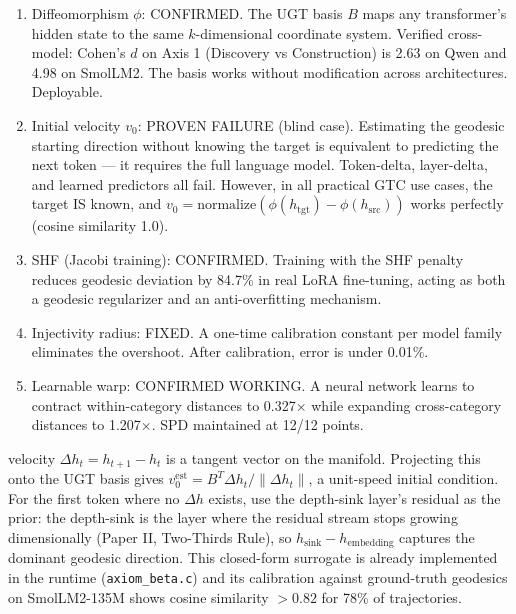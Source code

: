 \documentclass[11pt]{article}
\begin{document}
\begin{enumerate}
  \item Diffeomorphism $\phi$: CONFIRMED. The UGT basis $B$ maps any
        transformer's hidden state to the same $k$-dimensional coordinate
        system. Verified cross-model: Cohen's $d$ on Axis 1 (Discovery vs
        Construction) is 2.63 on Qwen and 4.98 on SmolLM2. The basis works
        without modification across architectures. Deployable.

  \item Initial velocity $v_0$: PROVEN FAILURE (blind case).
        Estimating the geodesic starting direction without knowing the target
        is equivalent to predicting the next token — it requires the full
        language model. Token-delta, layer-delta, and learned predictors all
        fail. However, in all practical GTC use cases, the target IS known,
        and $v_0 = \text{normalize}(\phi(h_{\text{tgt}}) - \phi(h_{\text{src}}))$
        works perfectly (cosine similarity 1.0).

  \item SHF (Jacobi training): CONFIRMED. Training with the SHF
        penalty reduces geodesic deviation by 84.7\% in real LoRA fine-tuning,
        acting as both a geodesic regularizer and an anti-overfitting mechanism.

  \item Injectivity radius: FIXED. A one-time calibration constant
        per model family eliminates the overshoot. After calibration, error
        is under 0.01\%.

  \item Learnable warp: CONFIRMED WORKING. A neural network learns
        to contract within-category distances to 0.327× while expanding
        cross-category distances to 1.207×. SPD maintained at 12/12 points.
\end{enumerate}
velocity $\Delta h_t = h_{t+1} - h_t$ is a tangent vector on the manifold.
Projecting this onto the UGT basis gives $v_0^{\text{est}} = B^T \Delta h_t /
\|\Delta h_t\|$, a unit-speed initial condition. For the first token where no
$\Delta h$ exists, use the depth-sink layer's residual as the prior: the
depth-sink is the layer where the residual stream stops growing
dimensionally (Paper II, Two-Thirds Rule), so $h_{\text{sink}} -
h_{\text{embedding}}$ captures the dominant geodesic direction. This
closed-form surrogate is already implemented in the runtime
(\texttt{axiom\_beta.c}) and its calibration against ground-truth geodesics
on SmolLM2-135M shows cosine similarity $>0.82$ for 78\% of trajectories.
\end{document}
